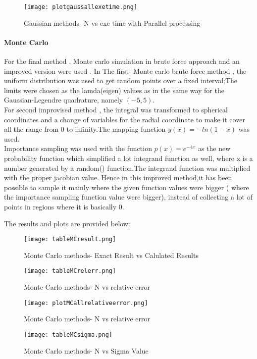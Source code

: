 \documentclass[9pt,a4paper,titlepage]{article}
\begin{document}
\begin{figure}[H]
  \texttt{[image: plotgaussallexetime.png]}
  \caption{Gaussian methods- N vs exe time with Parallel processing}
  \label{fig:jacobialg}
\end{figure}

\paragraph{Monte Carlo} For the final method , Monte carlo simulation in brute force approach and an improved version were used . In The first- Monte carlo brute force method , the uniform distribution was used to get random points over a fixed interval;The limits were chosen as the lamda(eigen) values as  in the same way for the Gaussian-Legendre quadrature, namely $(-5,5)$.
\\ 
For second improvised method ,  the integral was transformed to spherical coordinates and  a change of variables for the radial coordinate to make it cover all the range from 0 to infinity.The mapping function $y(x)=-ln(1-x)$ was used.
\\Importance sampling was used with the function $ p(x) = e^{-4x}$  as the new probability function which simplified a lot  integrand function as well, where x is a number generated by a random() function.The integrand function  was multiplied with the proper jacobian value.
Hence in this improved method,it has been possible to sample it mainly where the given function values were bigger ( where the importance sampling function value were bigger), instead of collecting a lot of points in regions where it is basically 0.

The results and plots are provided below:

\begin{figure}[H]
  \texttt{[image: tableMCresult.png]}
  \caption{Monte Carlo methods- Exact Result vs Calulated Results}
  \label{fig:MCrelerr}
\end{figure}


\begin{figure}[H]
  \texttt{[image: tableMCrelerr.png]}
  \caption{Monte Carlo methods- N vs relative error}
  \label{fig:MCrelerr}
\end{figure}

\begin{figure}[H]
  \texttt{[image: plotMCallrelativeerror.png]}
  \caption{Monte Carlo methods- N vs relative error}
  \label{fig:MCrelerr}
\end{figure}
\newpage
\begin{figure}[H]
  \texttt{[image: tableMCsigma.png]}
  \caption{Monte Carlo methods- N vs Sigma Value}
  \label{fig:MCrelerr}
\end{figure}
\end{document}
